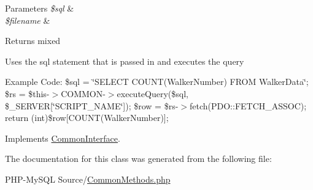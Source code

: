 \begin{DoxyParams}{Parameters}
{\em \$sql} & \\
\hline
{\em \$filename} & \\
\hline
\end{DoxyParams}
\begin{DoxyReturn}{Returns}
mixed
\end{DoxyReturn}
Uses the sql statement that is passed in and executes the query

Example Code\+: \$sql = \char`\"{}\+S\+E\+L\+E\+C\+T C\+O\+U\+N\+T(\+Walker\+Number) F\+R\+O\+M Walker\+Data\char`\"{}; \$rs = \$this-\/$>$C\+O\+M\+M\+O\+N-\/$>$execute\+Query(\$sql, \$\+\_\+\+S\+E\+R\+V\+ER\mbox{[}\char`\"{}\+S\+C\+R\+I\+P\+T\+\_\+\+N\+A\+M\+E\char`\"{}\mbox{]}); \$row = \$rs-\/$>$fetch(\+P\+D\+O\+::\+F\+E\+T\+C\+H\+\_\+\+A\+S\+S\+O\+C); return (int)\$row\mbox{[}\textquotesingle{}C\+O\+U\+N\+T(\+Walker\+Number)\textquotesingle{}\mbox{]}; 

Implements \hyperlink{interface_common_interface}{Common\+Interface}.



The documentation for this class was generated from the following file\+:\begin{DoxyCompactItemize}
\item 
P\+H\+P-\/\+My\+S\+Q\+L Source/\hyperlink{_common_methods_8php}{Common\+Methods.\+php}\end{DoxyCompactItemize}
